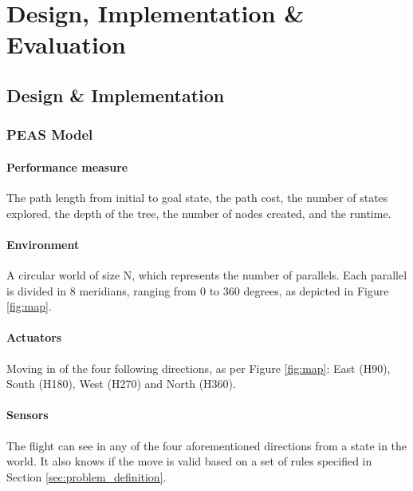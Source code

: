 \documentclass[letterpaper,12pt]{article}
\begin{document}

\newpage
\section{Design, Implementation \& Evaluation}
\label{sec:design-implementation-evaluation}

\subsection{Design \& Implementation}


\subsubsection{PEAS Model}

\paragraph{Performance measure} The path length from initial to goal state, the path cost, the number of states explored, the depth of the tree, the number of nodes created, and the runtime.

\paragraph{Environment} A circular world of size N, which represents the number of parallels. Each parallel is divided in 8 meridians, ranging from 0 to 360 degrees, as depicted in Figure \ref{fig:map}.

\paragraph{Actuators} Moving in of the four following directions, as per Figure \ref{fig:map}: East (H90), South (H180), West (H270) and North (H360).

\paragraph{Sensors} The flight can see in any of the four aforementioned directions from a state in the world. It also knows if the move is valid based on a set of rules specified in Section \ref{sec:problem_definition}.
\end{document}
